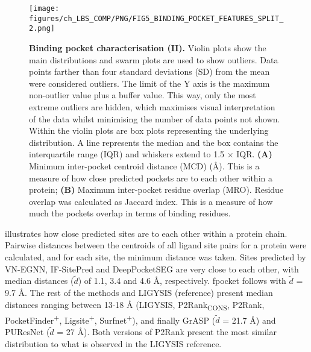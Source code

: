\begin{figure}[ht!]
    \centering
    \texttt{[image: figures/ch\_LBS\_COMP/PNG/FIG5\_BINDING\_POCKET\_FEATURES\_SPLIT\_2.png]}
    \caption[Binding pocket characterisation (II)]{\textbf{Binding pocket characterisation (II).} Violin plots show the main distributions and swarm plots are used to show outliers. Data points farther than four standard deviations (SD) from the mean were considered outliers. The limit of the Y axis is the maximum non-outlier value plus a buffer value. This way, only the most extreme outliers are hidden, which maximises visual interpretation of the data whilst minimising the number of data points not shown. Within the violin plots are box plots representing the underlying distribution. A line represents the median and the box contains the interquartile range (IQR) and whiskers extend to 1.5 $\times$ IQR. \textbf{(A)} Minimum inter-pocket centroid distance (MCD) (\AA{}). This is a measure of how close predicted pockets are to each other within a protein; \textbf{(B)} Maximum inter-pocket residue overlap (MRO). Residue overlap was calculated as Jaccard index. This is a measure of how much the pockets overlap in terms of binding residues.}
    \label{fig:pocket_features_2}
\end{figure}

 illustrates how close predicted sites are to each other within a protein chain. Pairwise distances between the centroids of all ligand site pairs for a protein were calculated, and for each site, the minimum distance was taken. Sites predicted by VN-EGNN, IF-SitePred and DeepPocketSEG are very close to each other, with median distances ($\tilde{\textit{d}}$) of 1.1, 3.4 and 4.6 \AA{}, respectively. fpocket follows with $\tilde{\textit{d}}$ = 9.7 \AA{}. The rest of the methods and LIGYSIS (reference) present median distances ranging between 13-18 \AA{} (LIGYSIS, P2Rank\textsubscript{CONS}, P2Rank, PocketFinder\textsuperscript{+}, Ligsite\textsuperscript{+}, Surfnet\textsuperscript{+}), and finally GrASP ($\tilde{\textit{d}}$ = 21.7 \AA{}) and PUResNet ($\tilde{\textit{d}}$ = 27 \AA{}). Both versions of P2Rank present the most similar distribution to what is observed in the LIGYSIS reference.

